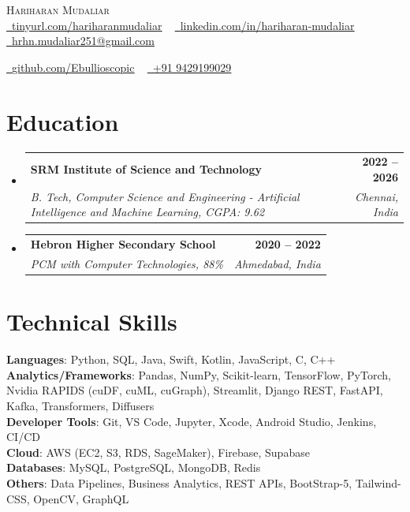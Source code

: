 \documentclass[letterpaper,11pt]{article}
\makeatletter
\newcommand{\resumeSubheading}[4]{
  \vspace{-2pt}\item
    \begin{tabular*}{1.0\textwidth}[t]{l@{\extracolsep{\fill}}r}
      \textbf{#1} & \textbf{\small #2} \\
      \textit{\small#3} & \textit{\small #4} \\
    \end{tabular*}\vspace{-7pt}
}
\newcommand{\resumeSubHeadingListStart}{\begin{itemize}[leftmargin=0.0in, label={}]}
\newcommand{\resumeSubHeadingListEnd}{\end{itemize}}
\makeatother
\begin{document}
\begin{center}
    {\Huge \scshape Hariharan Mudaliar} \\ \vspace{1pt}
    \href{https://tinyurl.com/hariharanmudaliar}{\raisebox{-0.2\height}\faLink\ \underline{tinyurl.com/hariharanmudaliar}} ~
    \href{https://linkedin.com/in/hariharan-mudaliar}{\raisebox{-0.2\height}\faLinkedin\ \underline{linkedin.com/in/hariharan-mudaliar}} ~
    \href{mailto:hrhn.mudaliar251@gmail.com}{\raisebox{-0.2\height}\faEnvelope\ \underline{hrhn.mudaliar251@gmail.com}} ~
    
    \href{https://github.com/Ebullioscopic}{\raisebox{-0.2\height}\faGithub\ \underline{github.com/Ebullioscopic}} ~
    \href{tel:+919429199029}{\raisebox{-0.2\height}\faPhone\ +91 9429199029}
\end{center}

\section{Education}
\resumeSubHeadingListStart
  \resumeSubheading
    {SRM Institute of Science and Technology}{2022 -- 2026}
    {B. Tech, Computer Science and Engineering - Artificial Intelligence and Machine Learning, CGPA: 9.62}{Chennai, India}
\resumeSubHeadingListEnd

\resumeSubHeadingListStart
  \resumeSubheading
    {Hebron Higher Secondary School}{2020 -- 2022}
    {PCM with Computer Technologies, 88\%}{Ahmedabad, India}
\resumeSubHeadingListEnd


\section{Technical Skills}
 \begin{itemize}[leftmargin=0.15in, label={}]
    \small{\item{
  	\textbf{Languages}{: Python, SQL, Java, Swift, Kotlin, JavaScript, C, C++} \\
  	\textbf{Analytics/Frameworks}{: Pandas, NumPy, Scikit-learn, TensorFlow, PyTorch, Nvidia RAPIDS (cuDF, cuML, cuGraph), Streamlit, Django REST, FastAPI, Kafka, Transformers, Diffusers} \\
  	\textbf{Developer Tools}{: Git, VS Code, Jupyter, Xcode, Android Studio, Jenkins, CI/CD} \\
  	\textbf{Cloud}{: AWS (EC2, S3, RDS, SageMaker), Firebase, Supabase} \\
  	\textbf{Databases}{: MySQL, PostgreSQL, MongoDB, Redis} \\
  	\textbf{Others}{: Data Pipelines, Business Analytics, REST APIs, BootStrap-5, Tailwind-CSS, OpenCV, GraphQL} \\
    }}
 \end{itemize}
\end{document}
